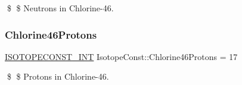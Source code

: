 \$ \$ Neutrons in Chlorine-\/46. \mbox{\label{group___isotope_const-_chlorine-_cl46_ga6d91210fe2429be0bee465bb80866e42}} 
\subsubsection{\texorpdfstring{Chlorine46\+Protons}{Chlorine46Protons}}
{\footnotesize\ttfamily \mbox{\hyperlink{group___isotope_const-_macros_ga5f18360b3e99483a35c32d789e62621c}{I\+S\+O\+T\+O\+P\+E\+C\+O\+N\+S\+T\+\_\+\+I\+NT}} Isotope\+Const\+::\+Chlorine46\+Protons = 17}

\$ \$ Protons in Chlorine-\/46. 